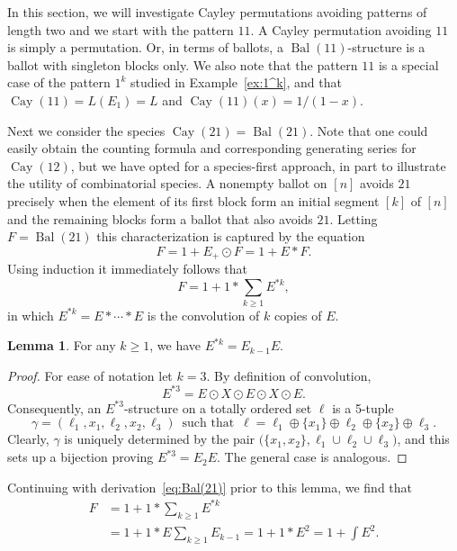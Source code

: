 \documentclass[a4paper, 11pt]{article}
\DeclareMathOperator{\Bal}{Bal}
\DeclareMathOperator{\Cay}{Cay}
\theoremstyle{definition}
\newtheorem{lemma}[theorem]{Lemma}
\begin{document}
In this section, we will investigate Cayley permutations avoiding
patterns of length two and we start with the pattern $11$. A Cayley
permutation avoiding $11$ is simply a permutation. Or, in terms of
ballots, a $\Bal(11)$-structure is a ballot with singleton blocks
only. We also note that the pattern $11$ is a special case of
the pattern $1^k$ studied in Example~\ref{ex:1^k}, and that
$\Cay(11) = L(E_1) = L$ and $\Cay(11)(x)=1/(1-x)$.

Next we consider the species $\Cay(21)=\Bal(21)$. Note that one could easily obtain the 
counting formula and corresponding generating series for $\Cay(12)$, 
but we have opted for a species-first approach, in part to illustrate the utility of 
combinatorial species.
A nonempty ballot on
$[n]$ avoids $21$ precisely when the element of its first block form an
initial segment $[k]$ of $[n]$ and the remaining blocks form a ballot
that also avoids $21$. Letting $F=\Bal(21)$ this characterization is
captured by the equation
\[
  F = 1 + E_+ \odot F = 1 + E * F.
\]
Using induction it immediately follows that
\begin{equation}\label{eq:Bal(21)}
  F = 1 + 1*\sum_{k\geq 1} E^{*k},
\end{equation}
in which $E^{*k} = E * \cdots * E$ is the convolution of $k$ copies of $E$.

\begin{lemma}
  For any $k\geq 1$, we have $E^{*k} = E_{k-1}E$.
\end{lemma}
\begin{proof}
  For ease of notation let $k=3$. 
  By definition of convolution,
  \[
    E^{*3} = E \odot X \odot E \odot X\odot  E.
  \]
  Consequently, an $E^{*3}$-structure on a totally ordered set $\ell$ is
  a 5-tuple
  \[
    \gamma = (\ell_1,x_1,\ell_2,x_2,\ell_3)
    \,\text{ such that }\,
    \ell = \ell_1\oplus\{x_1\}\oplus\ell_2\oplus\{x_2\}\oplus\ell_3.
  \]
  Clearly, $\gamma$ is uniquely determined by the pair
  $\bigl(\{x_1,x_2\},\ell_1\cup\ell_2\cup\ell_3\bigr)$,
  and this sets up a bijection proving $E^{*3} = E_{2}E$. The general
  case is analogous.
\end{proof}

Continuing with derivation~\eqref{eq:Bal(21)} prior to this lemma, we find that
\begin{align*}
  F
  &= 1 + 1*\sum_{k\geq 1} E^{*k} \\
  &= 1+ 1*E\sum_{k\geq 1} E_{k-1} = 1 + 1*E^2 = 1 + \int\!\! E^2.
\end{align*}
\end{document}
